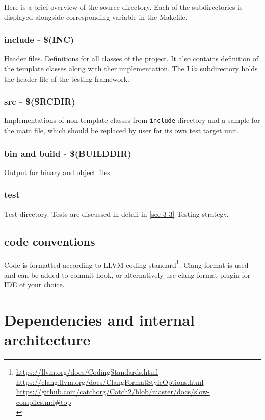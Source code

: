 \documentclass{elteikthesis}[2018/06/06]
\begin{document}
Here is a brief overview of the source directory. Each of the subdirectories is displayed alongside corresponding variable in the Makefile. \\

\subsubsection{include - \$(INC)}
\label{sec-3-1-1-1}
Header files. Definitions for all classes of the project. It also contains definition of the template classes along with ther implementation. The \lstinline{lib} subdirectory holds the header file of the testing framework. \\
\subsubsection{src - \$(SRCDIR)}
\label{sec-3-1-1-2}
Implementations of non-template classes from \lstinline{include} directory and a sample for the main file, which should be replaced by user for its own test target unit. \\
\subsubsection{bin and build - \$(BUILDDIR)}
\label{sec-3-1-1-3}
Output for binary and object files \\
\subsubsection{test}
\label{sec-3-1-1-4}
Test directory. Tests are discussed in detail in \ref{sec-3-3} Testing strategy. \\
\subsection{code conventions}
\label{sec-3-1-2}
Code is formatted according to LLVM coding standard\footnote{\url{https://llvm.org/docs/CodingStandards.html} \\
\url{https://clang.llvm.org/docs/ClangFormatStyleOptions.html} \\
\url{https://github.com/catchorg/Catch2/blob/master/docs/slow-compiles.md#top} \\}. Clang-format is used and can be added to commit hook, or alternatively use clang-format plugin for IDE of your choice. \\
\section{Dependencies and internal architecture}
\label{sec-3-2}
\end{document}
